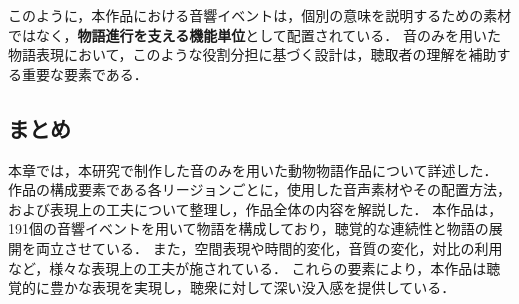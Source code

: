 このように，本作品における音響イベントは，個別の意味を説明するための素材ではなく，\textbf{物語進行を支える機能単位}として配置されている．
音のみを用いた物語表現において，このような役割分担に基づく設計は，聴取者の理解を補助する重要な要素である．
\subsection{まとめ}
本章では，本研究で制作した音のみを用いた動物物語作品について詳述した．
作品の構成要素である各リージョンごとに，使用した音声素材やその配置方法，および表現上の工夫について整理し，作品全体の内容を解説した．
本作品は，191個の音響イベントを用いて物語を構成しており，聴覚的な連続性と物語の展開を両立させている．
また，空間表現や時間的変化，音質の変化，対比の利用など，様々な表現上の工夫が施されている．
これらの要素により，本作品は聴覚的に豊かな表現を実現し，聴衆に対して深い没入感を提供している．
